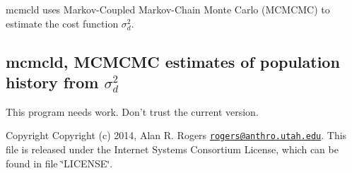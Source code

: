 {\ttfamily mcmcld} uses Markov-\/\+Coupled Markov-\/\+Chain Monte Carlo (M\+C\+M\+C\+M\+C) to estimate the cost function $\sigma_d^2$.

\label{mcmcld_mcmcld}%
\hypertarget{mcmcld_mcmcld}{}%
\subsection*{mcmcld, M\+C\+M\+C\+M\+C estimates of population history from $\sigma_d^2$ }

This program needs work. Don't trust the current version.

\begin{DoxyCopyright}{Copyright}
Copyright (c) 2014, Alan R. Rogers \href{mailto:rogers@anthro.utah.edu}{\tt rogers@anthro.\+utah.\+edu}. This file is released under the Internet Systems Consortium License, which can be found in file \char`\"{}\+L\+I\+C\+E\+N\+S\+E\char`\"{}. 
\end{DoxyCopyright}
